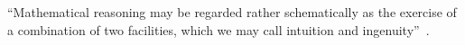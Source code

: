 
\begin{epigrafe}
    \vspace*{\fill}
    \begin{citacao}

        ``Mathematical reasoning may be regarded rather schematically as the exercise of a combination of two facilities, which we may call intuition and ingenuity''~\cite{turing:1939}.

    \end{citacao}
\end{epigrafe}

